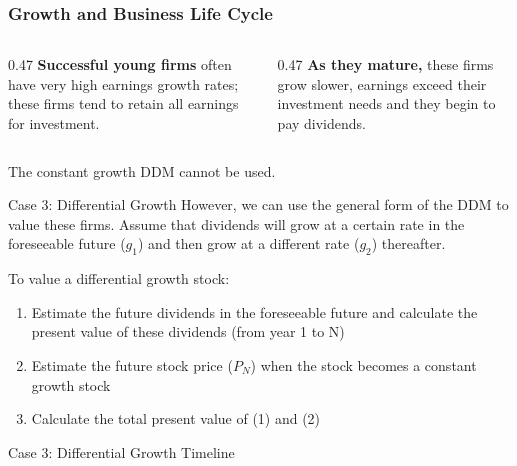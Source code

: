 \documentclass[9pt,aspectratio=169]{beamer}
\begin{document}
\begin{frame}
\frametitle{Growth and Business Life Cycle}
\vspace{0.6em}
\begin{columns}[t]
\begin{column}{0.47\textwidth}
\textbf{Successful young firms} often have very high earnings growth rates; these firms
tend to retain all earnings for investment.
\end{column}
\begin{column}{0.47\textwidth}
\textbf{As they mature,} these firms grow slower, earnings exceed their investment needs
and they begin to pay dividends.
\end{column}
\end{columns}

\vspace{1.2em}
The constant growth DDM cannot be used.
\end{frame}


\begin{frame}{Case 3: Differential Growth}
However, we can use the general form of the DDM to value these firms. Assume that
dividends will grow at a certain rate in the foreseeable future ($g_1$) and then grow at a
different rate ($g_2$) thereafter.

\vspace{0.8em}
To value a differential growth stock:
\begin{enumerate}
\item Estimate the future dividends in the foreseeable future and calculate the present value of these dividends (from year 1 to N)
\item Estimate the future stock price ($P_N$) when the stock becomes a constant growth stock
\item Calculate the total present value of (1) and (2)
\end{enumerate}
\end{frame}


\begin{frame}{Case 3: Differential Growth Timeline}
\begin{center}

\end{center}

\end{frame}
\end{document}
